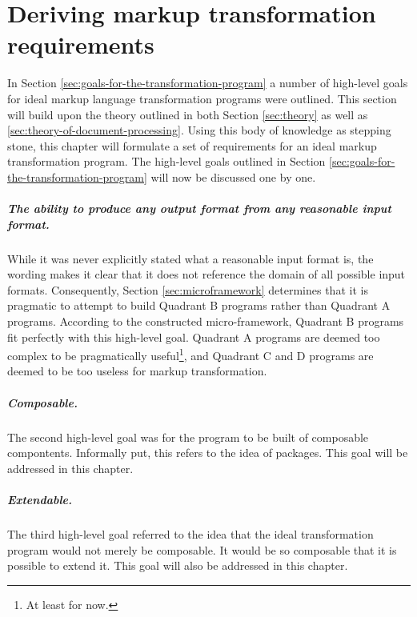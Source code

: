 \documentclass{scrreprt}
\begin{document}
\chapter{Deriving markup transformation requirements}
\label{chpt:derived-transformation-requirements}
In Section \ref{sec:goals-for-the-transformation-program} a number of high-level goals for ideal markup language transformation programs were outlined. This section will build upon the theory outlined in both Section \ref{sec:theory} as well as \ref{sec:theory-of-document-processing}. Using this body of knowledge as stepping stone, this chapter will formulate a set of requirements for an ideal markup transformation program. The high-level goals outlined in Section \ref{sec:goals-for-the-transformation-program} will now be discussed one by one.

\paragraph{The ability to produce any output format from any reasonable input format.} While it was never explicitly stated what a reasonable input format is, the wording makes it clear that it does not reference the domain of all possible input formats. Consequently, Section \ref{sec:microframework} determines that it is pragmatic to attempt to build Quadrant B programs rather than Quadrant A programs. According to the constructed micro-framework, Quadrant B programs fit perfectly with this high-level goal. Quadrant A programs are deemed too complex to be pragmatically useful\footnote{At least for now.}, and Quadrant C and D programs are deemed to be too useless for markup transformation.

\paragraph{Composable.} The second high-level goal was for the program to be built of composable compontents. Informally put, this refers to the idea of packages. This goal will be addressed in this chapter.

\paragraph{Extendable.} The third high-level goal referred to the idea that the ideal transformation program would not merely be composable. It would be so composable that it is possible to extend it. This goal will also be addressed in this chapter.
\end{document}
